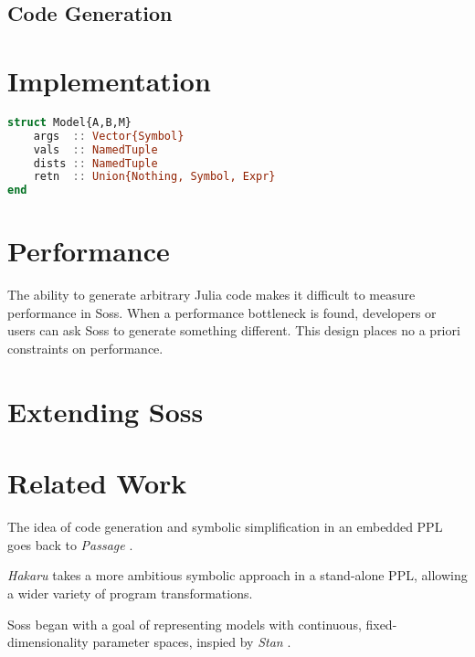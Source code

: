 \documentclass[anonymous=false, %
               format=acmsmall, %
               review=true, %
               screen=true, %
               nonacm=true]{acmart}
\begin{document}
\subsection{Code Generation}

\section{Implementation}

\begin{lstlisting}[language=julia]
struct Model{A,B,M} 
    args  :: Vector{Symbol}
    vals  :: NamedTuple
    dists :: NamedTuple
    retn  :: Union{Nothing, Symbol, Expr}
end
\end{lstlisting}


\section{Performance}



The ability to generate arbitrary  Julia code makes it difficult to measure performance in Soss. When a performance bottleneck is found, developers or users can ask Soss to generate something different. This design places no a priori constraints on performance.


\section{Extending Soss}

\section{Related Work}

The idea of code generation and symbolic simplification in an embedded PPL goes back to \emph{Passage} \cite{Scherrer2012}. 

\emph{Hakaru} \cite{narayanan2016probabilistic} takes a more ambitious symbolic approach in a stand-alone PPL, allowing a wider variety of program transformations. 

Soss began with a goal of representing models with continuous, fixed-dimensionality parameter spaces, inspied by \emph{Stan} \cite{stan:2017}.
\end{document}
